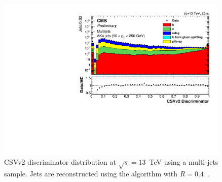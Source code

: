 \begin{figure}[ht!]
\begin{center}
    \includegraphics[width=0.99\textwidth]{images/btagCSV.pdf}
    \caption{CSVv2 discriminator distribution at $\sqrt{s}=13$~TeV using a multi-jets sample. Jets are reconstructed using the \antikt algorithm with $R=0.4$~\cite{CMS-PAS-BTV-15-001}.}
    \label{fig:CSVv2}
\end{center}
\end{figure}

